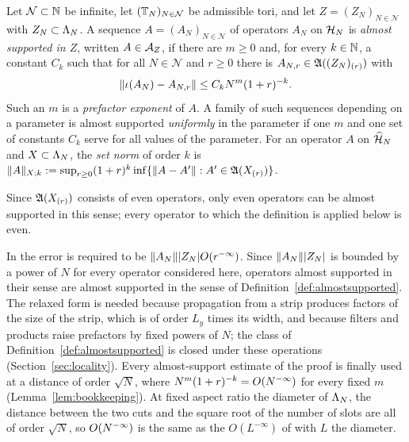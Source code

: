 \begin{definition}\label{def:almostsupported}
Let $\mathcal N\subset\mathbb{N}$ be infinite, let $(\mathbb{T}_N)_{N\in\mathcal N}$ be admissible tori, and let $Z=(Z_N)_{N\in\mathcal N}$
with $Z_N\subset\Lambda_N$. A sequence $A=(A_N)_{N\in\mathcal N}$ of operators $A_N$ on $\mathcal{H}_N$ is \emph{almost supported
in $Z$}, written $A\in\mathcal{A}_Z$, if there are $m\ge0$ and, for every $k\in\mathbb{N}$, a constant $C_k$ such that for all
$N\in\mathcal N$ and $r\ge0$ there is $A_{N,r}\in\mathfrak{A}((Z_N)_{(r)})$ with
\[
\lVert\iota(A_N)-A_{N,r}\rVert\le C_kN^m(1+r)^{-k}.
\]
Such an $m$ is a \emph{prefactor exponent} of $A$. A family of such sequences depending on a parameter is
almost supported \emph{uniformly} in the parameter if one $m$ and one set of constants $C_k$ serve for all
values of the parameter. For an operator $A$ on $\widehat{\mathcal{H}}_N$ and $X\subset\Lambda_N$, the \emph{set norm} of order
$k$ is $\lVert A\rVert_{X;k}:=\sup_{r\ge0}(1+r)^k\inf\{\lVert A-A'\rVert:A'\in\mathfrak{A}(X_{(r)})\}$.
\end{definition}

Since $\mathfrak{A}(X_{(r)})$ consists of even operators, only even operators can be almost supported in this sense;
every operator to which the definition is applied below is even.

\begin{remark}\label{rem:bbdf-almost}
In \cite[Section~2.3.1 and Appendix~C]{BBDF21} the error is required to be $\lVert A_N\rVert\lvert Z_N\rvert O(r^{-\infty})$.
Since $\lVert A_N\rVert\lvert Z_N\rvert$ is bounded by a power of $N$ for every operator considered here, operators almost
supported in their sense are almost supported in the sense of Definition~\ref{def:almostsupported}. The
relaxed form is needed because propagation from a strip produces factors of the size of the strip, which is
of order $L_y$ times its width, and because filters and products raise prefactors by fixed powers of $N$;
the class of Definition~\ref{def:almostsupported} is closed under these operations (Section~\ref{sec:locality}).
Every almost-support estimate of the proof is finally used at a distance of order $\sqrt N$, where
$N^m(1+r)^{-k}=O(N^{-\infty})$ for every fixed $m$ (Lemma~\ref{lem:bookkeeping}). At fixed aspect ratio the diameter of
$\Lambda_N$, the distance between the two cuts and the square root of the number of slots are all of order
$\sqrt N$, so $O(N^{-\infty})$ is the same as the $O(L^{-\infty})$ of \cite{BBDF21} with $L$ the diameter.
\end{remark}

